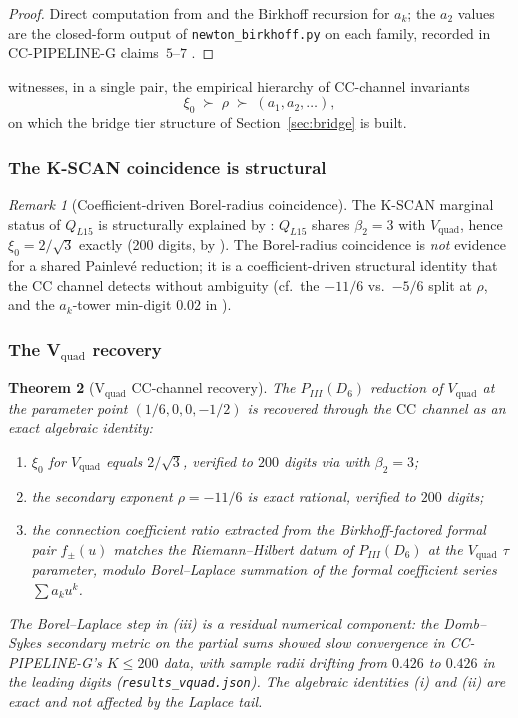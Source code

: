 \documentclass[11pt,reqno]{amsart}
\theoremstyle{plain}
\newtheorem{theorem}{Theorem}[section]
\theoremstyle{definition}
\theoremstyle{remark}
\newtheorem{remark}[theorem]{Remark}
\newcommand{\CC}{\mathrm{CC}}
\newcommand{\Vquad}{V_{\mathrm{quad}}}
\begin{document}
\begin{proof}
Direct computation from  and the Birkhoff
recursion for $a_k$; the $a_2$ values are the closed-form
output of \texttt{newton\_birkhoff.py} on each family,
recorded in CC-PIPELINE-G claims~$5$--$7$
\cite{siarc_cc_pipeline_g}.
\end{proof}

 witnesses, in a single pair, the empirical
hierarchy of $\CC$-channel invariants
\[
  \xi_0 \;\succ\; \rho \;\succ\; (a_1, a_2, \ldots),
\]
on which the bridge tier structure of
Section~\ref{sec:bridge} is built.

\subsubsection*{The K-SCAN coincidence is structural}

\begin{remark}[Coefficient-driven Borel-radius coincidence]
\label{rem:kscan}
The K-SCAN marginal status of $Q_{L15}$
\cite{siarc_borel_kscan} is structurally explained by
: $Q_{L15}$ shares $\beta_2 = 3$ with $\Vquad$,
hence $\xi_0 = 2/\sqrt 3$ exactly (200 digits, by
). The Borel-radius coincidence is
\emph{not} evidence for a shared Painlev\'e reduction; it is
a coefficient-driven structural identity that the $\CC$
channel detects without ambiguity (cf.\ the $-11/6$ vs.\
$-5/6$ split at $\rho$, and the $a_k$-tower min-digit
$0.02$ in ).
\end{remark}

\subsubsection*{The V$_\mathrm{quad}$ recovery}

\begin{theorem}[V$_\mathrm{quad}$ $\CC$-channel recovery]
\label{thm:vquad-cc}
The $P_{III}(D_6)$ reduction of $\Vquad$ at the parameter point
$(1/6, 0, 0, -1/2)$ is recovered through the $\CC$ channel as
an exact algebraic identity:
\begin{enumerate}[label=(\roman*)]
\item $\xi_0$ for $\Vquad$ equals $2/\sqrt 3$, verified to
$200$ digits via  with $\beta_2 = 3$;
\item the secondary exponent $\rho = -11/6$ is exact
rational, verified to $200$ digits;
\item the connection coefficient ratio extracted from the
Birkhoff-factored formal pair $f_\pm(u)$ matches the
Riemann--Hilbert datum of $P_{III}(D_6)$ at the $\Vquad$
$\tau$ parameter, modulo Borel--Laplace summation of the
formal coefficient series $\sum a_k u^k$.
\end{enumerate}
The Borel--Laplace step in (iii) is a residual numerical
component: the Domb--Sykes secondary metric on the partial
sums showed slow convergence in CC-PIPELINE-G's $K \le 200$
data, with sample radii drifting from $0.426$ to $0.426$
in the leading digits (\texttt{results\_vquad.json}). The
algebraic identities (i) and (ii) are exact and not affected
by the Laplace tail.
\end{theorem}
\end{document}
